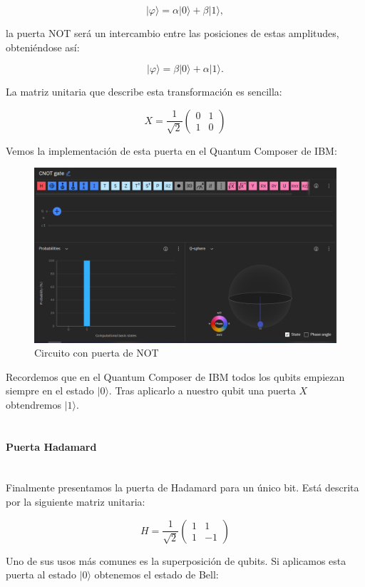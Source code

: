 \documentclass[11pt]{article}
\newcommand{\ra}{\rangle}
\newcommand{\myparagraph}[1]{\paragraph*{ \\ #1}\mbox{}\\}
\theoremstyle{plain}
\begin{document}
\[
	|\varphi\ra = \alpha |0\ra + \beta |1\ra,
\]

la puerta NOT será un intercambio entre las posiciones de estas amplitudes, obteniéndose así:

\[
	|\varphi\ra = \beta |0\ra + \alpha |1\ra.
\]

La matriz unitaria que describe esta transformación es sencilla:

\[
X = \frac{1}{\sqrt 2}
\begin{pmatrix}
	0 & 1 \\
	1 & 0 
\end{pmatrix}
\]

Vemos la implementación de esta puerta en el Quantum Composer de IBM:

\begin{figure}[H]
	\centering
	\includegraphics[scale=0.5]{figures/gate-x.png}
	\caption{Circuito con puerta de NOT}
\end{figure}

Recordemos que en el Quantum Composer de IBM todos los qubits empiezan siempre en el estado $|0\ra$. Tras aplicarlo a nuestro qubit una puerta $X$ obtendremos $|1\ra$. \\


\myparagraph{Puerta Hadamard}


Finalmente presentamos la puerta de Hadamard para un único bit. Está descrita por la siguiente matriz unitaria:

\[
	H = \frac{1}{\sqrt 2}
	\begin{pmatrix}
		1 & 1 \\
		1 & -1 
	\end{pmatrix}
\]

Uno de sus usos más comunes es la superposición de qubits. Si aplicamos esta puerta al estado $|0\ra$ obtenemos el estado de Bell:
\end{document}
